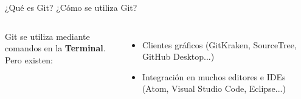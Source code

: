 \begin{frame}{¿Qué es Git?}
  \alert{\Large ¿Cómo se utiliza Git?}
  \begin{columns}[onlytextwidth]
    Git se utiliza mediante comandos en la \textbf{Terminal}. \\

    Pero existen:
    \begin{itemize}
      \item Clientes gráficos (GitKraken, SourceTree, GitHub Desktop...)
      \item Integración en muchos editores e IDEs (Atom, Visual Studio Code, Eclipse...)
    \end{itemize}
    \vspace{0.5cm}
  \end{columns}
\end{frame}
